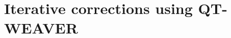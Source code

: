 \documentclass[10pt,a4paper]{article}
\begin{document}



\vspace{-22pt}
\section{Iterative corrections using QT-WEAVER}
\end{document}
